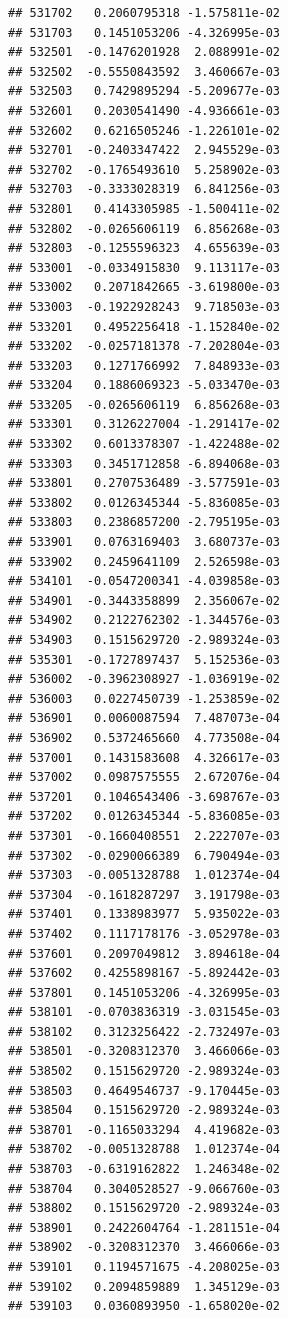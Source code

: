 \begin{frame}[fragile]
\begin{verbatim}
## 531702   0.2060795318 -1.575811e-02
## 531703   0.1451053206 -4.326995e-03
## 532501  -0.1476201928  2.088991e-02
## 532502  -0.5550843592  3.460667e-03
## 532503   0.7429895294 -5.209677e-03
## 532601   0.2030541490 -4.936661e-03
## 532602   0.6216505246 -1.226101e-02
## 532701  -0.2403347422  2.945529e-03
## 532702  -0.1765493610  5.258902e-03
## 532703  -0.3333028319  6.841256e-03
## 532801   0.4143305985 -1.500411e-02
## 532802  -0.0265606119  6.856268e-03
## 532803  -0.1255596323  4.655639e-03
## 533001  -0.0334915830  9.113117e-03
## 533002   0.2071842665 -3.619800e-03
## 533003  -0.1922928243  9.718503e-03
## 533201   0.4952256418 -1.152840e-02
## 533202  -0.0257181378 -7.202804e-03
## 533203   0.1271766992  7.848933e-03
## 533204   0.1886069323 -5.033470e-03
## 533205  -0.0265606119  6.856268e-03
## 533301   0.3126227004 -1.291417e-02
## 533302   0.6013378307 -1.422488e-02
## 533303   0.3451712858 -6.894068e-03
## 533801   0.2707536489 -3.577591e-03
## 533802   0.0126345344 -5.836085e-03
## 533803   0.2386857200 -2.795195e-03
## 533901   0.0763169403  3.680737e-03
## 533902   0.2459641109  2.526598e-03
## 534101  -0.0547200341 -4.039858e-03
## 534901  -0.3443358899  2.356067e-02
## 534902   0.2122762302 -1.344576e-03
## 534903   0.1515629720 -2.989324e-03
## 535301  -0.1727897437  5.152536e-03
## 536002  -0.3962308927 -1.036919e-02
## 536003   0.0227450739 -1.253859e-02
## 536901   0.0060087594  7.487073e-04
## 536902   0.5372465660  4.773508e-04
## 537001   0.1431583608  4.326617e-03
## 537002   0.0987575555  2.672076e-04
## 537201   0.1046543406 -3.698767e-03
## 537202   0.0126345344 -5.836085e-03
## 537301  -0.1660408551  2.222707e-03
## 537302  -0.0290066389  6.790494e-03
## 537303  -0.0051328788  1.012374e-04
## 537304  -0.1618287297  3.191798e-03
## 537401   0.1338983977  5.935022e-03
## 537402   0.1117178176 -3.052978e-03
## 537601   0.2097049812  3.894618e-04
## 537602   0.4255898167 -5.892442e-03
## 537801   0.1451053206 -4.326995e-03
## 538101  -0.0703836319 -3.031545e-03
## 538102   0.3123256422 -2.732497e-03
## 538501  -0.3208312370  3.466066e-03
## 538502   0.1515629720 -2.989324e-03
## 538503   0.4649546737 -9.170445e-03
## 538504   0.1515629720 -2.989324e-03
## 538701  -0.1165033294  4.419682e-03
## 538702  -0.0051328788  1.012374e-04
## 538703  -0.6319162822  1.246348e-02
## 538704   0.3040528527 -9.066760e-03
## 538802   0.1515629720 -2.989324e-03
## 538901   0.2422604764 -1.281151e-04
## 538902  -0.3208312370  3.466066e-03
## 539101   0.1194571675 -4.208025e-03
## 539102   0.2094859889  1.345129e-03
## 539103   0.0360893950 -1.658020e-02

\end{verbatim}
\end{frame}
